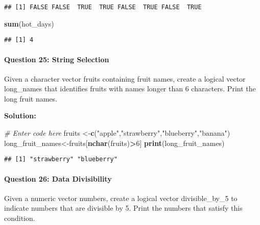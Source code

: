 \documentclass[
]{article}
\newenvironment{Shaded}{\begin{snugshade}}{\end{snugshade}}
\newcommand{\CommentTok}[1]{\textcolor[rgb]{0.56,0.35,0.01}{\textit{#1}}}
\newcommand{\DecValTok}[1]{\textcolor[rgb]{0.00,0.00,0.81}{#1}}
\newcommand{\FunctionTok}[1]{\textcolor[rgb]{0.13,0.29,0.53}{\textbf{#1}}}
\newcommand{\NormalTok}[1]{#1}
\newcommand{\OtherTok}[1]{\textcolor[rgb]{0.56,0.35,0.01}{#1}}
\newcommand{\SpecialCharTok}[1]{\textcolor[rgb]{0.81,0.36,0.00}{\textbf{#1}}}
\newcommand{\StringTok}[1]{\textcolor[rgb]{0.31,0.60,0.02}{#1}}
\begin{document}
\begin{verbatim}
## [1] FALSE FALSE  TRUE  TRUE FALSE  TRUE FALSE  TRUE
\end{verbatim}

\begin{Shaded}
\begin{Highlighting}[]
\FunctionTok{sum}\NormalTok{(hot\_days)}
\end{Highlighting}
\end{Shaded}

\begin{verbatim}
## [1] 4
\end{verbatim}

\hypertarget{question-25-string-selection}{%
\paragraph{Question 25: String
Selection}\label{question-25-string-selection}}

Given a character vector fruits containing fruit names, create a logical
vector long\_names that identifies fruits with names longer than 6
characters. Print the long fruit names.

\textbf{Solution:}

\begin{Shaded}
\begin{Highlighting}[]
\CommentTok{\# Enter code here}
\NormalTok{fruits }\OtherTok{\textless{}{-}}\FunctionTok{c}\NormalTok{(}\StringTok{"apple"}\NormalTok{,}\StringTok{"strawberry"}\NormalTok{,}\StringTok{"blueberry"}\NormalTok{,}\StringTok{"banana"}\NormalTok{)}
\NormalTok{long\_fruit\_names}\OtherTok{\textless{}{-}}\NormalTok{fruits[}\FunctionTok{nchar}\NormalTok{(fruits)}\SpecialCharTok{\textgreater{}}\DecValTok{6}\NormalTok{]}
\FunctionTok{print}\NormalTok{(long\_fruit\_names)}
\end{Highlighting}
\end{Shaded}

\begin{verbatim}
## [1] "strawberry" "blueberry"
\end{verbatim}

\hypertarget{question-26-data-divisibility}{%
\paragraph{Question 26: Data
Divisibility}\label{question-26-data-divisibility}}

Given a numeric vector numbers, create a logical vector divisible\_by\_5
to indicate numbers that are divisible by 5. Print the numbers that
satisfy this condition.
\end{document}
